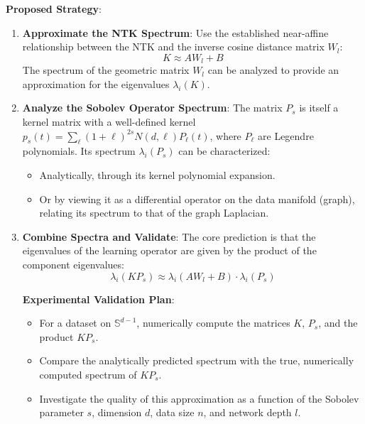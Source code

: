 \documentclass[a4paper]{article}
\begin{document}
\textbf{Proposed Strategy}:

\begin{enumerate}
    \item \textbf{Approximate the NTK Spectrum}:
    Use the established near-affine relationship between the NTK and the inverse cosine distance matrix $W_l$:
    \[ K \approx A W_l + B \]
    The spectrum of the geometric matrix $W_l$ can be analyzed to provide an approximation for the eigenvalues $\lambda_i(K)$.

    \item \textbf{Analyze the Sobolev Operator Spectrum}:
    The matrix $P_s$ is itself a kernel matrix with a well-defined kernel $p_s(t) = \sum_{\ell} (1+\ell)^{2s} N(d,\ell) P_\ell(t)$, where $P_\ell$ are Legendre polynomials. Its spectrum $\lambda_i(P_s)$ can be characterized:
    \begin{itemize}
        \item Analytically, through its kernel polynomial expansion.
        \item Or by viewing it as a differential operator on the data manifold (graph), relating its spectrum to that of the graph Laplacian.
    \end{itemize}

    \item \textbf{Combine Spectra and Validate}:
    The core prediction is that the eigenvalues of the learning operator are given by the product of the component eigenvalues:
    \[ \lambda_i(K P_s) \approx \lambda_i(A W_l + B) \cdot \lambda_i(P_s) \]
    
    \textbf{Experimental Validation Plan}:
    \begin{itemize}
        \item For a dataset on $\mathbb{S}^{d-1}$, numerically compute the matrices $K$, $P_s$, and the product $K P_s$.
        \item Compare the analytically predicted spectrum with the true, numerically computed spectrum of $K P_s$.
        \item Investigate the quality of this approximation as a function of the Sobolev parameter $s$, dimension $d$, data size $n$, and network depth $l$.
    \end{itemize}
\end{enumerate}
\end{document}
